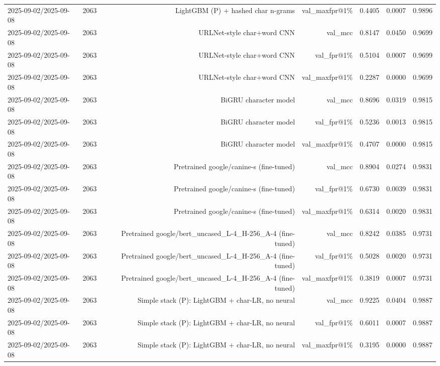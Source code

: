 \begin{table}[t]
\begin{tabular}{llrrrrr}
2025-09-02/2025-09-08 & 2063 & LightGBM (P) + hashed char n-grams & val\_maxfpr@1\% & 0.4405 & 0.0007 & 0.9896 \\
2025-09-02/2025-09-08 & 2063 & URLNet-style char+word CNN & val\_mcc & 0.8147 & 0.0450 & 0.9699 \\
2025-09-02/2025-09-08 & 2063 & URLNet-style char+word CNN & val\_fpr@1\% & 0.5104 & 0.0007 & 0.9699 \\
2025-09-02/2025-09-08 & 2063 & URLNet-style char+word CNN & val\_maxfpr@1\% & 0.2287 & 0.0000 & 0.9699 \\
2025-09-02/2025-09-08 & 2063 & BiGRU character model & val\_mcc & 0.8696 & 0.0319 & 0.9815 \\
2025-09-02/2025-09-08 & 2063 & BiGRU character model & val\_fpr@1\% & 0.5236 & 0.0013 & 0.9815 \\
2025-09-02/2025-09-08 & 2063 & BiGRU character model & val\_maxfpr@1\% & 0.4707 & 0.0000 & 0.9815 \\
2025-09-02/2025-09-08 & 2063 & Pretrained google/canine-s (fine-tuned) & val\_mcc & 0.8904 & 0.0274 & 0.9831 \\
2025-09-02/2025-09-08 & 2063 & Pretrained google/canine-s (fine-tuned) & val\_fpr@1\% & 0.6730 & 0.0039 & 0.9831 \\
2025-09-02/2025-09-08 & 2063 & Pretrained google/canine-s (fine-tuned) & val\_maxfpr@1\% & 0.6314 & 0.0020 & 0.9831 \\
2025-09-02/2025-09-08 & 2063 & Pretrained google/bert\_uncased\_L-4\_H-256\_A-4 (fine-tuned) & val\_mcc & 0.8242 & 0.0385 & 0.9731 \\
2025-09-02/2025-09-08 & 2063 & Pretrained google/bert\_uncased\_L-4\_H-256\_A-4 (fine-tuned) & val\_fpr@1\% & 0.5028 & 0.0020 & 0.9731 \\
2025-09-02/2025-09-08 & 2063 & Pretrained google/bert\_uncased\_L-4\_H-256\_A-4 (fine-tuned) & val\_maxfpr@1\% & 0.3819 & 0.0007 & 0.9731 \\
2025-09-02/2025-09-08 & 2063 & Simple stack (P): LightGBM + char-LR, no neural & val\_mcc & 0.9225 & 0.0404 & 0.9887 \\
2025-09-02/2025-09-08 & 2063 & Simple stack (P): LightGBM + char-LR, no neural & val\_fpr@1\% & 0.6011 & 0.0007 & 0.9887 \\
2025-09-02/2025-09-08 & 2063 & Simple stack (P): LightGBM + char-LR, no neural & val\_maxfpr@1\% & 0.3195 & 0.0000 & 0.9887 \\
\bottomrule
\end{tabular}
\end{table}